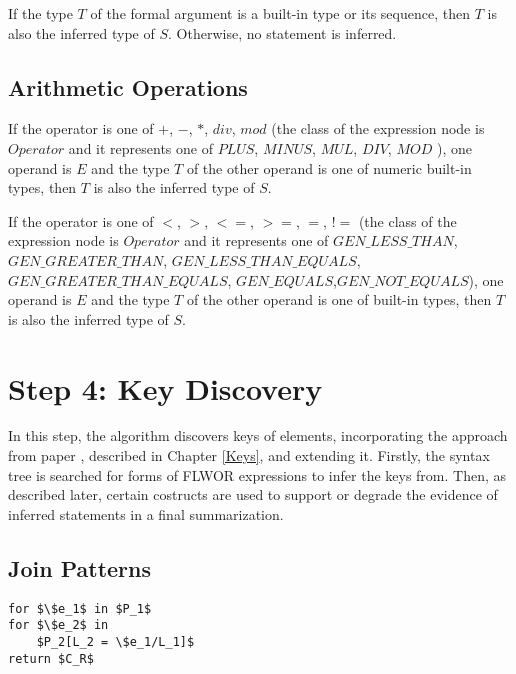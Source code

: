 If the type $T$ of the formal argument is a built-in type or its sequence, then $T$ is also the inferred type of $S$. Otherwise, no statement is inferred.

\subsection{Arithmetic Operations}
If the operator is one of $+$, $-$, $*$, $div$, $mod$ (the class of the expression node is $Operator$ and it represents one of $PLUS$, $MINUS$, $MUL$, $DIV$, $MOD$ ), one operand is $E$ and the type $T$ of the other operand is one of numeric built-in types, then $T$ is also the inferred type of $S$.

If the operator is one of $<$, $>$, $<=$, $>=$, $=$, $!=$ (the class of the expression node is $Operator$ and it represents one of $GEN\_LESS\_THAN$, \linebreak $GEN\_GREATER\_THAN$, $GEN\_LESS\_THAN\_EQUALS$,\linebreak $GEN\_GREATER\_THAN\_EQUALS$, $GEN\_EQUALS$,\linebreak $GEN\_NOT\_EQUALS$), one operand is $E$ and the type $T$ of the other operand is one of built-in types, then $T$ is also the inferred type of $S$.


\section{Step 4: Key Discovery}
In this step, the algorithm discovers keys of elements, incorporating the approach from paper \cite{Necasky:2009:DXK:1529282.1529414}, described in Chapter \ref{Keys}, and extending it. Firstly, the syntax tree is searched for forms of FLWOR expressions to infer the keys from. Then, as described later, certain costructs are used to support or degrade the evidence of inferred statements in a final summarization.

\subsection{Join Patterns}

\begin{lstlisting}[mathescape, float, caption=Other form of the for join pattern., frame=single, label=listing_other_for_join_pattern]
for $\$e_1$ in $P_1$
for $\$e_2$ in
    $P_2[L_2 = \$e_1/L_1]$
return $C_R$
\end{lstlisting}

